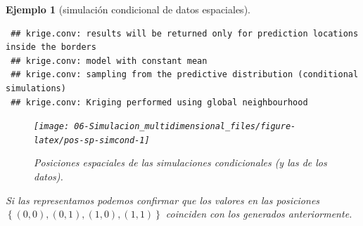 \documentclass[
]{book}
\theoremstyle{break}
\newtheorem{example}{Ejemplo}[chapter]
\theoremstyle{nonumberplain}
\begin{document}
\begin{example}[simulación condicional de datos espaciales]
\begin{verbatim}
 ## krige.conv: results will be returned only for prediction locations inside the borders
 ## krige.conv: model with constant mean
 ## krige.conv: sampling from the predictive distribution (conditional simulations)
 ## krige.conv: Kriging performed using global neighbourhood
\end{verbatim}

\begin{figure}[!htb]

{\centering \texttt{[image: 06-Simulacion\_multidimensional\_files/figure-latex/pos-sp-simcond-1]} 

}

\caption{Posiciones espaciales de las simulaciones condicionales (y las de los datos).}\label{fig:pos-sp-simcond}
\end{figure}

Si las representamos podemos confirmar que los valores en las posiciones \(\left\{(0,0),(0,1),(1,0),(1,1)\right\}\) coinciden con los generados anteriormente.


\end{example}
\end{document}
